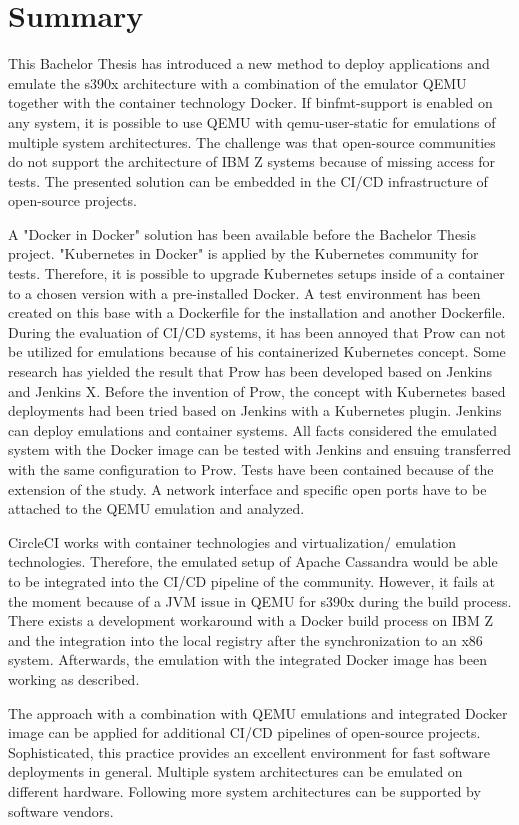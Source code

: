 \chapter{Summary}\label{ch:summary}

This Bachelor Thesis has introduced a new method to deploy applications and emulate the s390x architecture with a combination of the emulator \gls{QEMU} together with the container technology Docker.
If binfmt-support is enabled on any system, it is possible to use \gls{QEMU} with qemu-user-static for emulations of multiple system architectures. 
The challenge was that open-source communities do not support the architecture of IBM Z systems because of missing access for tests. The presented solution can be embedded in the \gls{CI/CD} infrastructure of open-source projects. 

A "Docker in Docker" solution has been available before the Bachelor Thesis project. "Kubernetes in Docker" is applied by the Kubernetes community for tests. 
Therefore, it is possible to upgrade Kubernetes setups inside of a container to a chosen version with a pre-installed Docker. A test environment has been created on this base with a Dockerfile for the installation and another Dockerfile. During the evaluation of \gls{CI/CD} systems, it has been annoyed that Prow can not be utilized for emulations because of his containerized Kubernetes concept. 
Some research has yielded the result that Prow has been developed based on Jenkins and Jenkins X. Before the invention of Prow, the concept with Kubernetes based deployments had been  tried based on Jenkins with a Kubernetes plugin. Jenkins can deploy emulations and container systems. 
All facts considered the emulated system with the Docker image can be tested with Jenkins and ensuing transferred with the same configuration to Prow.
Tests have been contained because of the extension of the study. A network interface and specific open ports have to be attached to the \gls{QEMU} emulation and analyzed. 

CircleCI works with container technologies and virtualization/ emulation technologies. 
Therefore, the emulated setup of Apache Cassandra would be able to be integrated into the \gls{CI/CD} pipeline of the community. However, it fails at the moment because of a JVM issue in \gls{QEMU} for s390x during the build process. 
There exists a development workaround with a Docker build process on IBM Z and the integration into the local registry after the synchronization to an x86 system. Afterwards, the emulation with the integrated Docker image has been working as described.

The approach with a combination with \gls{QEMU} emulations and integrated Docker image can be applied for additional \gls{CI/CD} pipelines of open-source projects. Sophisticated, this practice provides an excellent environment for fast software deployments in general. 
Multiple system architectures can be emulated on different hardware. Following more system architectures can be supported by software vendors.